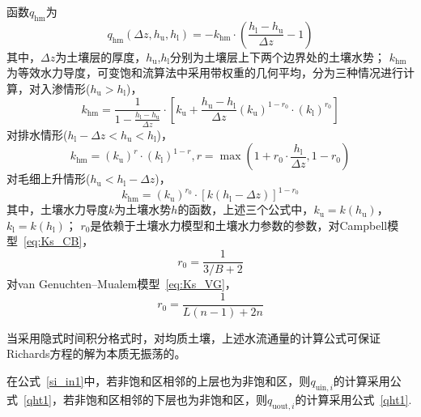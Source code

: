 \begin{enumerate}
    函数$q_{\mathrm{hm}}$为
    \begin{equation}
      q_{\mathrm{h m}}\left(\Delta z, h_{\mathrm{u}}, h_{\mathrm{l}}\right)=-k_{\mathrm{h m}} \cdot\left(\frac{h_{\mathrm{l}}-h_{\mathrm{u}}}{\Delta z}-1\right)
    \end{equation}
    其中，$\Delta z$为土壤层的厚度，$h_{\mathrm {u}} $,$h_{\mathrm {l}} $分别为土壤层上下两个边界处的土壤水势；
    $k_{\mathrm{hm}}$为等效水力导度，可变饱和流算法中采用带权重的几何平均，分为三种情况进行计算，对入渗情形($h_{\mathrm {u}} >h_{\mathrm {l}} $)，
    \begin{equation}
      k_{\mathrm{h m}}=\frac{1}{1-\frac{h_{\mathrm{l}}-h_{\mathrm{u}}}{\Delta z}} \cdot\left[k_{\mathrm{u}}+\frac{h_{\mathrm{u}}-h_{\mathrm{l}}}{\Delta z}\left(k_{\mathrm{u}}\right)^{1-r_{0}} \cdot\left(k_{\mathrm{l}}\right)^{r_{0}}\right]
    \end{equation}
    对排水情形($h_{\mathrm {l}} -\Delta z<h_{\mathrm {u}} <h_{\mathrm {l}} $)，
    \begin{equation}
      k_{\mathrm{h m}}=\left(k_{\mathrm{u}}\right)^{r} \cdot\left(k_{\mathrm{l}}\right)^{1-r}, r=\max \left(1+r_{0} \cdot \frac{h_{\mathrm{l}}}{\Delta z}, 1-r_{0}\right)
    \end{equation}
    对毛细上升情形($h_{\mathrm {u}} <h_{\mathrm {l}} -\Delta z$)，
    \begin{equation}
      k_{\mathrm{h m}}=\left(k_{\mathrm{u}}\right)^{r_{0}} \cdot\left[k\left(h_{\mathrm{l}}-\Delta z\right)\right]^{1-r_{0}}
    \end{equation}
    其中，土壤水力导度$k$为土壤水势$h$的函数，上述三个公式中，$k_{\mathrm {u}} =k(h_{\mathrm {u}}  )$，$k_{\mathrm {l}} =k(h_{\mathrm {l}}  )$；
    $r_0$是依赖于土壤水力模型和土壤水力参数的参数，对Campbell模型~\eqref{eq:Ks_CB}，
    \begin{equation}
      r_{0}=\frac{1}{3/B+2}
    \end{equation}
    对van Genuchten--Mualem模型~\eqref{eq:Ks_VG}，
    \begin{equation}
      r_{0}=\frac{1}{L(n-1)+2 n}
    \end{equation}

    当采用隐式时间积分格式时，对均质土壤，上述水流通量的计算公式可保证Richards方程的解为本质无振荡的。

    在公式~\eqref{si_in1}中，若非饱和区相邻的上层也为非饱和区，则$q_{\mathrm{uin},i}$的计算采用公式~\eqref{qht1}，若非饱和区相邻的下层也为非饱和区，则$q_{\mathrm{uout},i}$的计算采用公式~\eqref{qht1}.


\end{enumerate}
